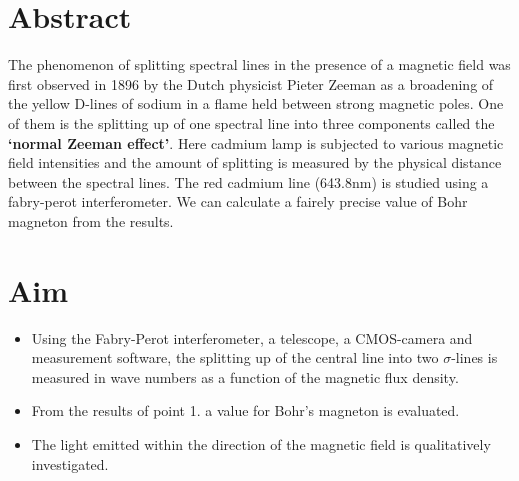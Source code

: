 \section{Abstract} 
	The phenomenon of splitting spectral lines in the presence of a magnetic field was first observed in 1896 by the Dutch physicist Pieter Zeeman as a broadening of the yellow D-lines of sodium in a flame held between strong magnetic poles. One of them is the splitting up of one spectral line into three components called the \textbf{`normal Zeeman effect'}. Here cadmium lamp is subjected to various magnetic field intensities and the amount of splitting is measured by the physical distance between the spectral lines. The red cadmium line (643.8nm) is studied using a fabry-perot interferometer. We can calculate a fairely precise value of Bohr magneton from the results.

\section{Aim}
	\begin{itemize}
		\item Using the Fabry-Perot interferometer, a telescope, a CMOS-camera and measurement software, the splitting up of the central line into two $\sigma$-lines is measured in wave numbers as a function of the magnetic flux density.
		\item From the results of point 1. a value for Bohr's magneton is evaluated.
		\item The light emitted within the direction of the magnetic field is qualitatively investigated.
	\end{itemize}